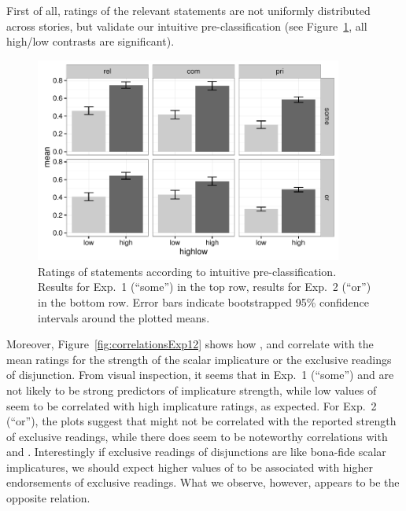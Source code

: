 \documentclass[12pt]{article}
\begin{document}
First of all, ratings of the relevant statements are not uniformly
distributed across stories, but validate our intuitive pre-classification (see
Figure~\ref{fig:EFbars12}, all high/low contrasts are significant).
%
\begin{figure}
  \centering

  \includegraphics[width = 0.9\textwidth]{pics_02/EFbarsExp12.pdf}
  
  \caption{Ratings of statements according to intuitive pre-classification. Results for
    Exp.~1 (``some'') in the top row, results for Exp.~2 (``or'') in the bottom
    row. Error bars indicate bootstrapped 95\% confidence intervals around the plotted means.}
  \label{fig:EFbars12}
\end{figure}
%
Moreover, Figure~\ref{fig:correlationsExp12} shows how \rel, \com and \pri correlate with the
mean ratings for the strength of the scalar implicature or the exclusive readings of
disjunction. From visual inspection, it seems that in Exp.~1 (``some'') \rel and \com are not
likely to be strong predictors of implicature strength, while low values of \pri seem to be
correlated with high implicature ratings, as expected. For Exp.~2 (``or''), the plots suggest
that \rel might not be correlated with the reported strength of exclusive readings, while there
does seem to be noteworthy correlations with \com and \pri. Interestingly if
exclusive readings of disjunctions are like bona-fide scalar implicatures, we should expect
higher values of \com to be associated with higher endorsements of exclusive
readings. What we observe, however, appears to be the opposite relation.
\end{document}
